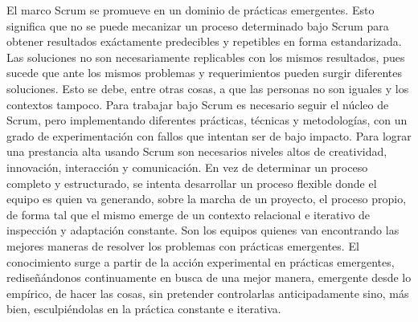 El marco Scrum se promueve en un dominio de prácticas emergentes. Esto significa que no se puede mecanizar un proceso determinado bajo Scrum para obtener resultados exáctamente predecibles y repetibles en forma estandarizada. Las soluciones no son necesariamente replicables con los mismos resultados, pues sucede que ante los mismos problemas y requerimientos pueden surgir diferentes soluciones. Esto se debe, entre otras cosas, a que las personas no son iguales y los contextos tampoco. Para trabajar bajo Scrum es necesario seguir el núcleo de Scrum, pero implementando diferentes prácticas, técnicas y metodologías, con un grado de experimentación con fallos que intentan ser de bajo impacto. Para lograr una prestancia alta usando Scrum son necesarios niveles altos de creatividad, innovación, interacción y comunicación. En vez de determinar un proceso completo y estructurado, se intenta desarrollar un proceso flexible donde el equipo es quien va generando, sobre la marcha de un proyecto, el proceso propio, de forma tal que el mismo emerge de un contexto relacional e iterativo de inspección y adaptación constante. Son los equipos quienes van encontrando las mejores maneras de resolver los problemas con prácticas emergentes. El conocimiento surge a partir de la acción experimental en prácticas emergentes, rediseñándonos continuamente en busca de una mejor manera, emergente desde lo empírico, de hacer las cosas, sin pretender controlarlas anticipadamente sino, más bien, esculpiéndolas en la práctica constante e iterativa.
